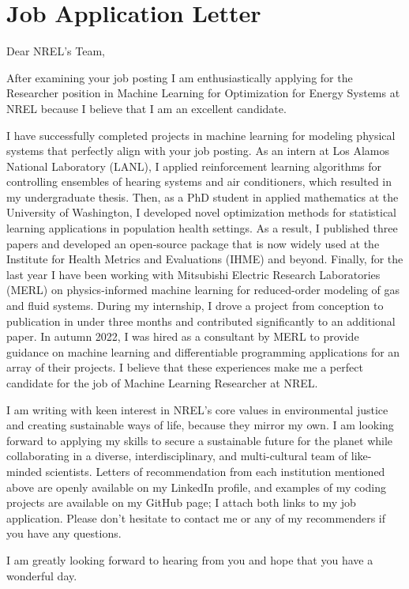 \section{Job Application Letter}

Dear NREL's Team,

After examining your job posting I am enthusiastically applying for the Researcher position in Machine Learning for Optimization for Energy Systems at NREL because I believe that I am an excellent candidate.

I have successfully completed projects in machine learning for modeling physical systems that perfectly align with your job posting. As an intern at Los Alamos National Laboratory (LANL), I applied reinforcement learning algorithms for controlling ensembles of hearing systems and air conditioners, which resulted in my undergraduate thesis. Then, as a PhD student in applied mathematics at the University of Washington, I developed novel optimization methods for statistical learning applications in population health settings. As a result, I published three papers and developed an open-source package that is now widely used at the Institute for Health Metrics and Evaluations (IHME) and beyond. Finally, for the last year I have been working with Mitsubishi Electric Research Laboratories (MERL) on physics-informed machine learning for reduced-order modeling of gas and fluid systems. During my internship, I drove a project from conception to publication in under three months and contributed significantly to an additional paper. In autumn 2022, I was hired as a consultant by MERL to provide guidance on machine learning and differentiable programming applications for an array of their projects. I believe that these experiences make me a perfect candidate for the job of Machine Learning Researcher at NREL. 

I am writing with keen interest in NREL's core values in environmental justice and creating sustainable ways of life, because they mirror my own. I am looking forward to applying my skills to secure a sustainable future for the planet while collaborating in a diverse, interdisciplinary, and multi-cultural team of like-minded scientists. Letters of recommendation from each institution mentioned above are openly available on my LinkedIn profile, and examples of my coding projects are available on my GitHub page; I attach both links to my job application. Please don't hesitate to contact me or any of my recommenders if you have any questions. 

I am greatly looking forward to hearing from you and hope that you have a wonderful day.